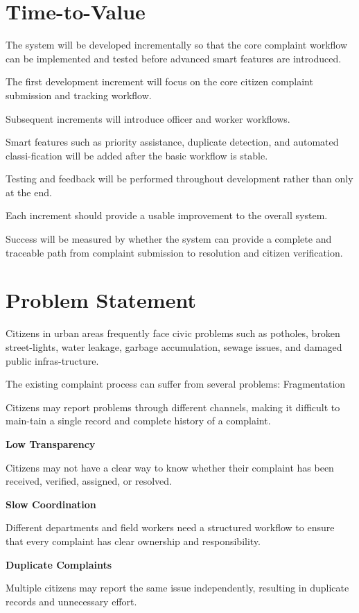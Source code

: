 \documentclass[12pt,a4paper]{article}
\begin{document}
\section{Time-to-Value}
The system will be developed incrementally so that the core complaint workflow can be implemented and tested before advanced smart features are introduced.

The first development increment will focus on the core citizen complaint submission and tracking workflow.

Subsequent increments will introduce officer and worker workflows.

Smart features such as priority assistance, duplicate detection, and automated classi-fication will be added after the basic workflow is stable.

Testing and feedback will be performed throughout development rather than only at the end.

Each increment should provide a usable improvement to the overall system.

Success will be measured by whether the system can provide a complete and traceable path from complaint submission to resolution and citizen verification.

\section{Problem Statement}
Citizens in urban areas frequently face civic problems such as potholes, broken street-lights, water leakage, garbage accumulation, sewage issues, and damaged public infras-tructure.

The existing complaint process can suffer from several problems: Fragmentation

Citizens may report problems through different channels, making it difficult to main-tain a single record and complete history of a complaint.

\textbf{Low Transparency}\par
Citizens may not have a clear way to know whether their complaint has been received, verified, assigned, or resolved.

\textbf{Slow Coordination}\par
Different departments and field workers need a structured workflow to ensure that every complaint has clear ownership and responsibility.

\textbf{Duplicate Complaints}\par
Multiple citizens may report the same issue independently, resulting in duplicate records and unnecessary effort.
\end{document}
